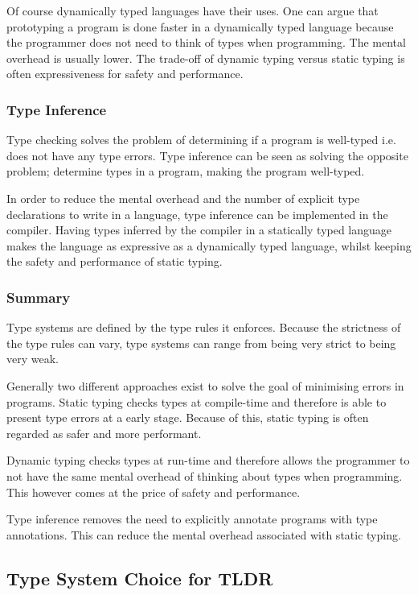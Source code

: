 Of course dynamically typed languages have their uses. One can argue that prototyping a program is done faster in a dynamically typed language because the programmer does not need to think of types when programming. The mental overhead is usually lower. The trade-off of dynamic typing versus static typing is often expressiveness for safety and performance.

\subsubsection{Type Inference}
Type checking solves the problem of determining if a program is well-typed i.e. does not have any type errors. Type inference can be seen as solving the opposite problem; determine types in a program, making the program well-typed.

In order to reduce the mental overhead and the number of explicit type declarations to write in a language, type inference can be implemented in the compiler. Having types inferred by the compiler in a statically typed language makes the language as expressive as a dynamically typed language, whilst keeping the safety and performance of static typing.

\subsubsection{Summary}
Type systems are defined by the type rules it enforces. Because the strictness of the type rules can vary, type systems can range from being very strict to being very weak.

Generally two different approaches exist to solve the goal of minimising errors in programs. Static typing checks types at compile-time and therefore is able to present type errors at a early stage. Because of this, static typing is often regarded as safer and more performant.

Dynamic typing checks types at run-time and therefore allows the programmer to not have the same mental overhead of thinking about types when programming. This however comes at the price of safety and performance.

Type inference removes the need to explicitly annotate programs with type annotations. This can reduce the mental overhead associated with static typing.

\subsection{Type System Choice for TLDR}


